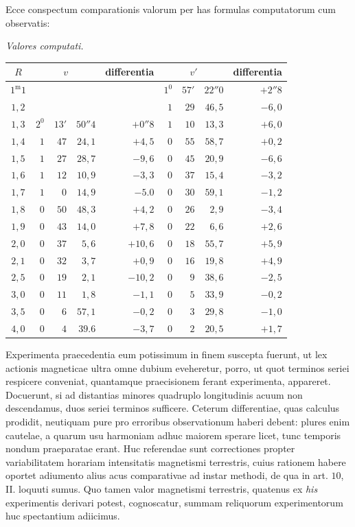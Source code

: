 Ecce conspectum comparationis valorum per has formulas computatorum cum observatis:
\begin{center}
\textit{Valores computati.}\par
\setlength{\tabcolsep}{4pt}
\begin{tabular}{c||rrr|r||rrr|r}
$R$&\multicolumn{3}{c|}{$v$}&differentia&\multicolumn{3}{c|}{$v'$}&differentia\\\hline
$1^{\mathrm m}1$&&&&&$1^0$&$57'$&$22''0$&$+2''8$\\
$1{,}2$&&&&&$1$&$29$&$46{,}5$&$-6{,}0$\\
$1{,}3$&$2^0$&$13'$&$50''4$&$+0''8$&$1$&$10$&$13{,}3$&$+6{,}0$\\
$1{,}4$&$1$&$47$&$24{,}1$&$+4{,}5$&$0$&$55$&$58{,}7$&$+0{,}2$\\
$1{,}5$&$1$&$27$&$28{,}7$&$-9{,}6$&$0$&$45$&$20{,}9$&$-6{,}6$\\
$1{,}6$&$1$&$12$&$10{,}9$&$-3{,}3$&$0$&$37$&$15{,}4$&$-3{,}2$\\
$1{,}7$&$1$&$0$&$14{,}9$&$-5.0$&$0$&$30$&$59{,}1$&$-1{,}2$\\
$1{,}8$&$0$&$50$&$48{,}3$&$+4{,}2$&$0$&$26$&$2{,}9$&$-3{,}4$\\
$1{,}9$&$0$&$43$&$14{,}0$&$+7{,}8$&$0$&$22$&$6{,}6$&$+2{,}6$\\
$2{,}0$&$0$&$37$&$5{,}6$&$+10{,}6$&$0$&$18$&$55{,}7$&$+5{,}9$\\
$2{,}1$&$0$&$32$&$3{,}7$&$+0{,}9$&$0$&$16$&$19{,}8$&$+4{,}9$\\
$2{,}5$&$0$&$19$&$2{,}1$&$-10{,}2$&$0$&$9$&$38{,}6$&$-2{,}5$\\
$3{,}0$&$0$&$11$&$1{,}8$&$-1{,}1$&$0$&$5$&$33{,}9$&$-0{,}2$\\
$3{,}5$&$0$&$6$&$57{,}1$&$-0{,}2$&$0$&$3$&$29{,}8$&$-1{,}0$\\
$4{,}0$&$0$&$4$&$39.6$&$-3{,}7$&$0$&$2$&$20{,}5$&$+1{,}7$
\end{tabular}
\end{center}

Experimenta praecedentia eum potissimum in finem suscepta fuerunt, ut lex actionis magneticae ultra omne dubium eveheretur, porro, ut quot terminos seriei respicere conveniat, quantamque praecisionem ferant experimenta, appareret. Docuerunt, si ad distantias minores quadruplo longitudinis acuum non descendamus, duos seriei terminos sufficere. Ceterum differentiae, quas calculus prodidit, neutiquam pure pro erroribus observationum haberi debent: plures enim cautelae, a quarum usu harmoniam adhuc maiorem sperare licet, tunc temporis nondum praeparatae erant. Huc referendae sunt correctiones propter variabilitatem horariam intensitatis magnetismi terrestris, cuius rationem habere oportet adiumento alius acus comparativae ad instar methodi, de qua in art. $10$, II. loquuti sumus. Quo tamen valor magnetismi terrestris, quatenus ex \textit{his} experimentis derivari potest, cognoscatur, summam reliquorum experimentorum huc spectantium adiicimus.

